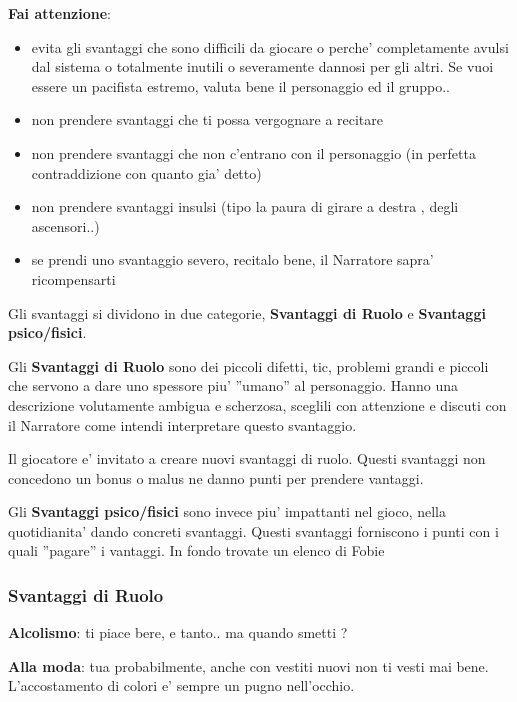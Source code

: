 \documentclass[a4paper,11pt,twoside,openany]{book}
\begin{document}
{		\textbf{Fai attenzione}:
		
		\begin{itemize}
			\item 
			evita gli svantaggi che sono difficili da giocare o perche' completamente avulsi dal sistema o totalmente inutili o severamente dannosi per gli altri. Se vuoi essere un pacifista estremo, valuta bene il personaggio ed il gruppo.. 
			\item 
			non prendere svantaggi che ti possa vergognare a recitare 
			\item 
			non prendere svantaggi che non c'entrano con il personaggio (in perfetta contraddizione con quanto gia' detto) 
			\item 
			non prendere svantaggi insulsi (tipo la paura di girare a destra , degli ascensori..) 
			\item 
			se prendi uno svantaggio severo, recitalo bene, il Narratore sapra' ricompensarti 
		\end{itemize}
		
		Gli svantaggi si dividono in due categorie, \textbf{Svantaggi di Ruolo} e \textbf{Svantaggi psico/fisici}. 
		
		Gli \textbf{Svantaggi di Ruolo} sono dei piccoli difetti, tic, problemi grandi e piccoli che servono a dare uno spessore piu' ''umano'' al personaggio. Hanno una descrizione volutamente ambigua e scherzosa, sceglili con attenzione e discuti con il Narratore come intendi interpretare questo svantaggio.
		
		Il giocatore e' invitato a creare nuovi svantaggi di ruolo. Questi svantaggi non concedono un bonus o malus ne danno punti per prendere vantaggi.
		
		\bigskip
		
		Gli \textbf{Svantaggi psico/fisici} sono invece piu' impattanti nel gioco, nella quotidianita' dando concreti svantaggi. Questi svantaggi forniscono i punti con i quali ''pagare'' i vantaggi. In fondo trovate un elenco di Fobie
		
		\pagebreak
		
		\subsubsection{Svantaggi di Ruolo}
		
		\bigskip
		
		\textbf{Alcolismo}: ti piace bere, e tanto.. ma quando smetti ?
		
		\textbf{Alla moda}: tua probabilmente, anche con vestiti nuovi non ti vesti mai bene. L'accostamento di colori e' sempre un pugno nell'occhio.
		
}
\end{document}
